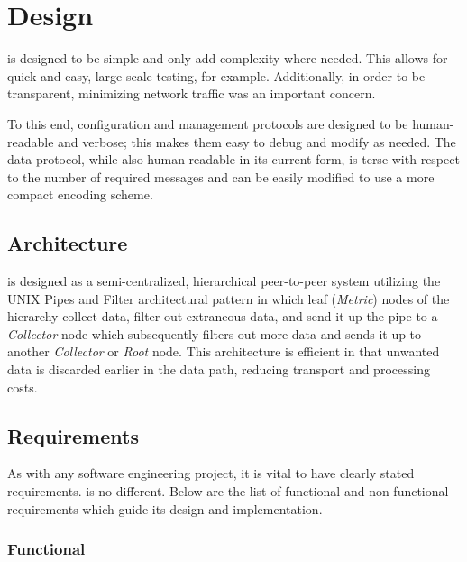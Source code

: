 \chapter{Design}
\label{design}

\dcamp is designed to be simple and only add complexity where needed. This allows for quick and easy, large scale
testing, for example. Additionally, in order to be transparent, minimizing network traffic was an important concern.

To this end, \dcamp configuration and management protocols are designed to be human-readable and verbose; this makes
them easy to debug and modify as needed. The data protocol, while also human-readable in its current form, is terse with
respect to the number of required messages and can be easily modified to use a more compact encoding scheme.

\section{Architecture}

\dcamp is designed as a semi-centralized, hierarchical peer-to-peer system utilizing the UNIX Pipes and Filter
architectural pattern \cite{pipe-filter} in which leaf (\textit{Metric}) nodes of the hierarchy collect data, filter out
extraneous data, and send it up the pipe to a \textit{Collector} node which subsequently filters out more data and sends
it up to another \textit{Collector} or \textit{Root} node. This architecture is efficient in that unwanted data is
discarded earlier in the data path, reducing transport and processing costs.

\section{Requirements}

As with any software engineering project, it is vital to have clearly stated requirements. \dcamp is no different. Below
are the list of functional and non-functional requirements which guide its design and implementation.

\subsection{Functional}


